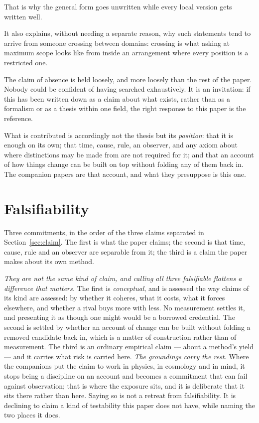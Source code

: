 \documentclass[11pt,a4paper]{article}
\theoremstyle{remark}\newtheorem{remark}[proposition]{Remark}
\begin{document}
That is why the general form goes unwritten while every local version gets written well.

It also explains, without needing a separate reason, why such statements tend to arrive from someone
crossing between domains: crossing is what asking at maximum scope looks like from inside an arrangement
where every position is a restricted one.

The claim of absence is held loosely, and more loosely than the rest of the paper. Nobody could be
confident of having searched exhaustively. It is an invitation: if this has been written down as a claim about what
exists, rather than as a formalism or as a thesis within one field, the right response to this paper is
the reference.

What is contributed is accordingly not the thesis but its \emph{position}: that it is enough on its own;
that time, cause, rule, an observer, and any axiom about where distinctions may be made from are not
required for it; and that an account of how things change can be built on top without folding any of
them back in. The companion papers are that account, and what they presuppose is this one.

\section{Falsifiability}\label{sec:falsifiability}
Three commitments, in the order of the three claims separated in Section~\ref{sec:claim}. The first is
what the paper claims; the second is that time, cause, rule and an observer are separable from it; the
third is a claim the paper makes about its own method.

\emph{They are not the same kind of claim, and calling all three falsifiable flattens a difference that
matters.} The first is \emph{conceptual}, and is assessed the way claims of its kind are assessed: by
whether it coheres, what it costs, what it forces elsewhere, and whether a rival buys more with less.
No measurement settles it, and presenting it as though one might would be a borrowed credential. The
second is settled by whether an account of change can be built without folding a removed candidate back
in, which is a matter of construction rather than of measurement. The third is an ordinary empirical
claim --- about a method's yield --- and it carries what risk is carried here. \emph{The groundings carry the rest.}
Where the companions put the claim to work in physics, in cosmology and in mind, it stops being a
discipline on an account and becomes a commitment that can fail against observation; that is where the
exposure sits, and it is deliberate that it sits there rather than here. Saying so is not a retreat
from falsifiability. It is declining to claim a kind of testability this paper does not have, while
naming the two places it does.
\end{document}
